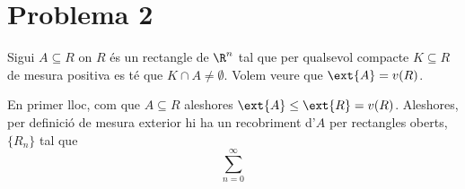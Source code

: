 \documentclass[12pt]{article}
\begin{document}
\section*{Problema 2}
Sigui \( A \subseteq R \) on \( R \) és un rectangle de \( \R^n \) tal que per qualsevol
compacte \( K \subseteq R \) de mesura positiva es té que \( K \cap A \neq \emptyset \).
Volem veure que \( \ext{A} = v(R) \). 

En primer lloc, com que \( A \subseteq R \) aleshores \( \ext{A} \leq \ext{R} = v(R) \).
Aleshores, per definició de mesura exterior hi ha un recobriment d'\( A \) per rectangles
oberts, \( \{ R_n \} \) tal que 
\begin{equation*}
	\sum_{n = 0}^{\infty}  
\end{equation*}












\end{document}
